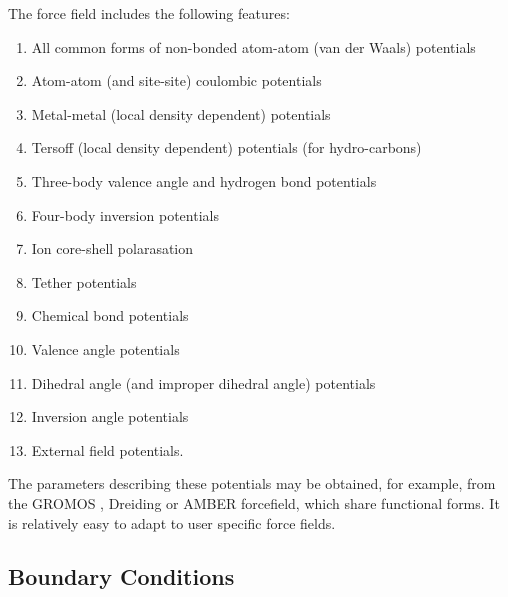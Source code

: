 The \D force field includes the
following features:
\begin{enumerate}
\item All common forms of non-bonded atom-atom (van der Waals) potentials
\item Atom-atom (and site-site) coulombic potentials
\item Metal-metal (local density dependent) potentials \cite{baskes-84a,baskes-86a,finnis-84a,sutton-90a,sutton-91a,todd-93a}
\item Tersoff (local density dependent) potentials (for hydro-carbons) \cite{tersoff-89a}
\item Three-body valence angle and hydrogen bond potentials
\item Four-body inversion potentials
\item Ion core-shell polarasation
\item Tether potentials
\item Chemical bond potentials
\item Valence angle potentials
\item Dihedral angle (and improper dihedral angle) potentials
\item Inversion angle potentials
\item External field potentials.
\end{enumerate}

\noindent The parameters describing these potentials may be
obtained, for example, from the GROMOS \cite{gunsteren-87a},
Dreiding \cite{mayo-90a} or
AMBER \cite{weiner-86a}
forcefield, which share functional forms.  It is relatively easy
to adapt \D to user specific force fields.

\subsection{Boundary Conditions}


